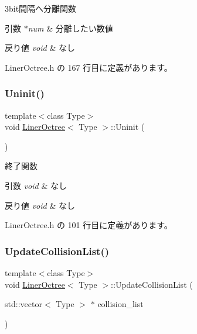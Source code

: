 3bit間隔へ分離関数 


\begin{DoxyParams}{引数}
{\em $\ast$num} & 分離したい数値 \\
\hline
\end{DoxyParams}

\begin{DoxyRetVals}{戻り値}
{\em void} & なし \\
\hline
\end{DoxyRetVals}


 Liner\+Octree.\+h の 167 行目に定義があります。

\mbox{\label{class_liner_octree_a86b5b9bc86630644e84508ff385cda69}} 
\subsubsection{\texorpdfstring{Uninit()}{Uninit()}}
{\footnotesize\ttfamily template$<$class Type$>$ \\
void \mbox{\hyperlink{class_liner_octree}{Liner\+Octree}}$<$ Type $>$\+::Uninit (\begin{DoxyParamCaption}{ }\end{DoxyParamCaption})\hspace{0.3cm}{\ttfamily [inline]}}



終了関数 


\begin{DoxyParams}{引数}
{\em void} & なし \\
\hline
\end{DoxyParams}

\begin{DoxyRetVals}{戻り値}
{\em void} & なし \\
\hline
\end{DoxyRetVals}


 Liner\+Octree.\+h の 101 行目に定義があります。

\mbox{\label{class_liner_octree_a89f700400ce575b869633328755d23cb}} 
\subsubsection{\texorpdfstring{Update\+Collision\+List()}{UpdateCollisionList()}}
{\footnotesize\ttfamily template$<$class Type$>$ \\
void \mbox{\hyperlink{class_liner_octree}{Liner\+Octree}}$<$ Type $>$\+::Update\+Collision\+List (\begin{DoxyParamCaption}\item[{std\+::vector$<$ Type $>$ $\ast$}]{collision\+\_\+list }\end{DoxyParamCaption})\hspace{0.3cm}{\ttfamily [inline]}}



